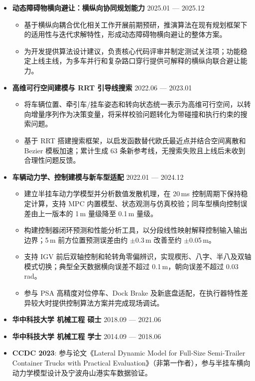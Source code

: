 \documentclass[zh]{resume}
\begin{document}
\begin{itemize}
  \item \textbf{动态障碍物横向避让：横纵向协同规划能力} \hfill 2025.01 --- 2025.12
  \begin{itemize}
    \item 基于横纵向耦合优化相关工作开展前期预研，推演算法在现有规划框架下的适用性与迭代求解特性，形成动态障碍物横向避让的整体方案。
    \item 为开发提供算法设计建议，负责核心代码评审并制定测试关注项；功能稳定上线主线，为多车并行和复杂路口穿行提供可解释的横纵向联合避让能力。
  \end{itemize}

  \item \textbf{高维可行空间建模与 RRT 引导线搜索} \hfill 2022.06 --- 2023.01
  \begin{itemize}
    \item 将车辆位置、牵引车/挂车姿态和转向状态统一表示为高维可行空间，以转向增量序列作为决策变量，将采样校验问题转化为带碰撞和执行约束的搜索问题。
    \item 基于 RRT 搭建搜索框架，以启发函数替代欧氏最近点并结合空间离散和 Bezier 模板加速；累计生成 63 条新参考线，无搜索失败且上线后未收到合理性问题反馈。
  \end{itemize}

  \item \textbf{车辆动力学、控制建模与新车型适配} \hfill 2022.01 --- 2024.12
  \begin{itemize}
    \item 建立半挂车动力学模型并分析数值发散机理，在 20\,ms 控制周期下保持稳定计算，支持 MPC 内置模型、状态观测与仿真校验；同车型横向控制误差由上一版本的 1\,m 量级降至 0.1\,m 量级。
    \item 构建控制器闭环预测和性能分析工具，以分段线性映射解释控制输入输出边界；5\,m 前方位置预测误差由约 $\pm$0.3\,m 改善至约 $\pm$0.05\,m。
    \item 支持 IGV 前后双轴控制和轮转角零偏辨识，实现楔形、八字、半八及双轴模式切换；典型全天数据横向误差不超过 0.1\,m，朝向误差不超过 0.03\,rad。
    \item 参与 PSA 高精度对位停车、Dock Brake 及新底盘适配，在执行器特性差异较大时提供控制算法方案并完成现场调试。
  \end{itemize}
\end{itemize}

\begin{itemize}
  \item \textbf{华中科技大学 \quad 机械工程 \quad 硕士} \hfill 2018.09 --- 2021.06
  \item \textbf{华中科技大学 \quad 机械工程 \quad 学士} \hfill 2014.09 --- 2018.06
  \item \textbf{CCDC 2023}: 参与论文《Lateral Dynamic Model for Full-Size Semi-Trailer Container Trucks with Practical Evaluation》（非第一作者），参与半挂车横向动力学模型设计及宁波舟山港实车数据验证。
\end{itemize}
\end{document}
